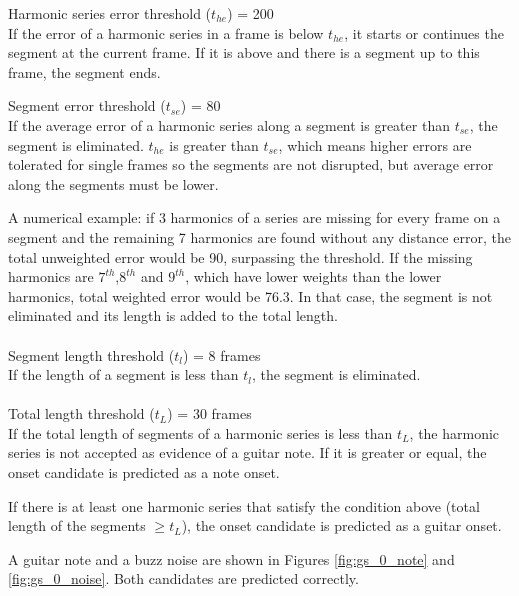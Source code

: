 Harmonic series error threshold ($t_{he}$) = 200 \\
If the error of a harmonic series in a frame is below  $t_{he}$, it starts or continues the segment at the current frame. If it is above and there is a segment up to this frame, the segment ends. 

Segment error threshold ($t_{se}$) = 80 \\
If the average error of a harmonic series along a segment is greater than $t_{se}$, the segment is eliminated. $t_{he}$ is greater than $t_{se}$, which means higher errors are tolerated for single frames so the segments are not disrupted, but average error along the segments must be lower. 

A numerical example: if 3 harmonics of a series are missing for every frame on a segment and the remaining 7 harmonics are found without any distance error, the total unweighted error would be 90, surpassing the threshold. If the missing harmonics are $7^{th}$,$8^{th}$ and $9^{th}$, which have lower weights than the lower harmonics, total weighted error would be 76.3. In that case, the segment is not eliminated and its length is added to the total length.    \\\\
Segment length threshold ($t_l$) = 8 frames \\
If the length of a segment is less than $t_l$, the segment is eliminated. \\\\
Total length threshold ($t_L$) = 30 frames\\
If the total length of segments of a harmonic series is less than $t_L$, the harmonic series is not accepted as evidence of a guitar note. If it is greater or equal, the onset candidate is predicted as a note onset. 

If there is at least one harmonic series that satisfy the condition above (total length of the segments $\geq t_L$), the onset candidate is predicted as a guitar onset.

A guitar note and a buzz noise are shown in Figures \ref{fig:gs_0_note} and \ref{fig:gs_0_noise}. Both candidates are predicted correctly.

